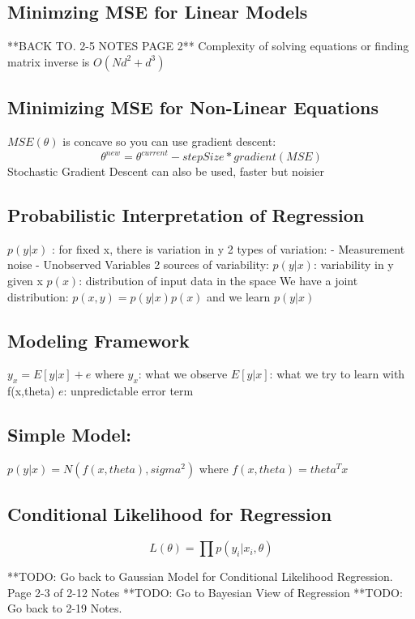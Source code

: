 \documentclass[11pt,psfig]{article}
\begin{document}
\setlength{\parskip}{1.2ex plus0.3ex minus 0.3ex}


\vfill\eject

\subsection*{Minimzing MSE for Linear Models}
**BACK TO. 2-5 NOTES PAGE 2**
Complexity of solving equations or finding matrix inverse is $O(N d^2 + d^3)$

\subsection*{Minimizing MSE for Non-Linear Equations}
$MSE(\theta)$ is concave so you can use gradient descent:
     \[
		\theta^{new} = \theta^{current} - stepSize*gradient(MSE)
		\]
Stochastic Gradient Descent can also be used, faster but noisier

\subsection*{Probabilistic Interpretation of Regression}
$p(y|x)$ : for fixed x, there is variation in y
2 types of variation:
     - Measurement noise
     - Unobserved Variables
2 sources of variability:
     $p(y|x)$: variability in y given x
     $p(x)$: distribution of input data in the space
We have a joint distribution: $p(x,y) = p(y|x)p(x)$ and we learn $p(y|x)$

\subsection*{Modeling Framework}
$y_x = E[y|x] + e$ where 
     $y_x$: what we observe
     $E[y|x]$: what we try to learn with f(x,theta)
     $e$: unpredictable error term

\subsection*{Simple Model:}
     $p(y|x) = N( f(x,theta), sigma^2)$ where $f(x,theta) = theta^Tx$

\subsection*{Conditional Likelihood for Regression}
\[
L(\theta) = \prod{p(y_i|x_i,\theta)}
\]

**TODO: Go back to Gaussian Model for Conditional Likelihood Regression. Page 2-3 of 2-12 Notes
**TODO: Go to Bayesian View of Regression
**TODO: Go back to 2-19 Notes.
\end{document}

